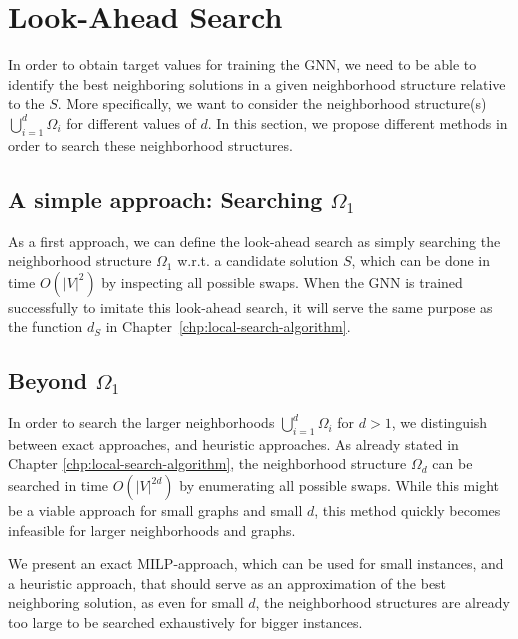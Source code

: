 \documentclass[draft,final]{vutinfth} %
\begin{document}
\section{Look-Ahead Search}\label{sec:lookahead-search}

In order to obtain target values for training the GNN, we need to be able to identify the best neighboring solutions in a given neighborhood structure relative to the $S$. More specifically, we want to consider the neighborhood structure(s) $\bigcup_{i=1}^d \Omega_i$ for different values of $d$. In this section, we propose different methods in order to search these neighborhood structures. 

\subsection{A simple approach: Searching $\Omega_1$}

As a first approach, we can define the look-ahead search as simply searching the neighborhood structure $\Omega_1$ w.r.t. a candidate solution $S$, which can be done in time $O(|V|^2)$ by inspecting all possible swaps. 
When the GNN is trained successfully to imitate this look-ahead search, it will serve the same purpose as the function $d_S$ in Chapter~\ref{chp:local-search-algorithm}. 

\subsection{Beyond $\Omega_1$}

In order to search the larger neighborhoods $\bigcup_{i=1}^d \Omega_i$ for $d > 1$, we distinguish between exact approaches, and heuristic approaches. 
As already stated in Chapter \ref{chp:local-search-algorithm}, the neighborhood structure $\Omega_d$ can be searched in time $O(|V|^{2d})$ by enumerating all possible swaps. While this might be a viable approach for small graphs and small $d$, this method quickly becomes infeasible for larger neighborhoods and graphs. 

We present an exact MILP-approach, which can be used for small instances, and a heuristic approach, that should serve as an approximation of the best neighboring solution, as even for small $d$, the neighborhood structures are already too large to be searched exhaustively for bigger instances. 
\end{document}
